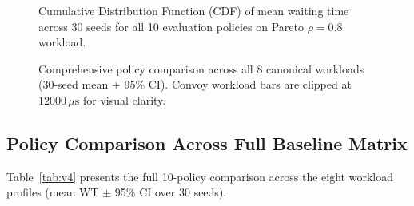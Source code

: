 \begin{figure}[t]
  \centering
  \caption{Cumulative Distribution Function (CDF) of mean waiting time across 30 seeds for all 10 evaluation policies on Pareto $\rho = 0.8$ workload.}
  \label{fig:cdf_waiting_time}
\end{figure}

\begin{figure}[t]
  \centering
  \caption{Comprehensive policy comparison across all 8 canonical workloads (30-seed mean $\pm$ 95\% CI). Convoy workload bars are clipped at $12000\,\mu\text{s}$ for visual clarity.}
  \label{fig:policy_bar_chart}
\end{figure}

\subsection{Policy Comparison Across Full Baseline Matrix}
\label{subsec:full_comparison}

Table~\ref{tab:v4} presents the full 10-policy comparison across the eight
workload profiles (mean WT $\pm$ 95\% CI over 30 seeds).

